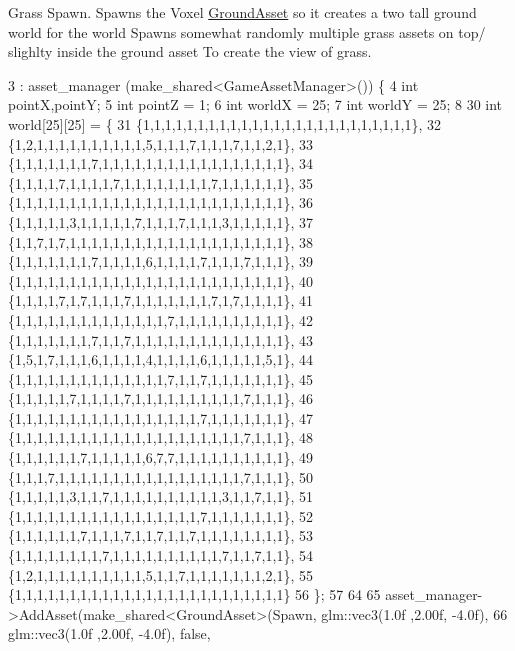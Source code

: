 Grass Spawn. Spawns the Voxel \hyperlink{class_ground_asset}{Ground\+Asset} so it creates a two tall ground world for the world Spawns somewhat randomly multiple grass assets on top/ slighlty inside the ground asset To create the view of grass.
\begin{DoxyCode}
3                      : asset\_manager (make\_shared<GameAssetManager>())  \{ 
4         \textcolor{keywordtype}{int} pointX,pointY;
5         \textcolor{keywordtype}{int} pointZ = 1;
6         \textcolor{keywordtype}{int} worldX = 25;
7         \textcolor{keywordtype}{int} worldY = 25;
8 
30           \textcolor{keywordtype}{int} world[25][25] = \{
31           \{1,1,1,1,1,1,1,1,1,1,1,1,1,1,1,1,1,1,1,1,1,1,1,1,1\},
32           \{1,2,1,1,1,1,1,1,1,1,1,1,5,1,1,1,7,1,1,1,7,1,1,2,1\},
33           \{1,1,1,1,1,1,1,7,1,1,1,1,1,1,1,1,1,1,1,1,1,1,1,1,1\},
34           \{1,1,1,1,7,1,1,1,1,7,1,1,1,1,1,1,1,1,7,1,1,1,1,1,1\},
35           \{1,1,1,1,1,1,1,1,1,1,1,1,1,1,1,1,1,1,1,1,1,1,1,1,1\},
36           \{1,1,1,1,1,3,1,1,1,1,1,7,1,1,1,7,1,1,1,3,1,1,1,1,1\},
37           \{1,1,7,1,7,1,1,1,1,1,1,1,1,1,1,1,1,1,1,1,1,1,1,1,1\},
38           \{1,1,1,1,1,1,1,7,1,1,1,1,6,1,1,1,1,7,1,1,1,7,1,1,1\},
39           \{1,1,1,1,1,1,1,1,1,1,1,1,1,1,1,1,1,1,1,1,1,1,1,1,1\},
40           \{1,1,1,1,7,1,7,1,1,1,7,1,1,1,1,1,1,1,7,1,7,1,1,1,1\},
41           \{1,1,1,1,1,1,1,1,1,1,1,1,1,1,7,1,1,1,1,1,1,1,1,1,1\},
42           \{1,1,1,1,1,1,1,7,1,1,7,1,1,1,1,1,1,1,1,1,1,1,1,1,1\},
43           \{1,5,1,7,1,1,1,6,1,1,1,1,4,1,1,1,1,6,1,1,1,1,1,5,1\},
44           \{1,1,1,1,1,1,1,1,1,1,1,1,1,1,7,1,1,7,1,1,1,1,1,1,1\},
45           \{1,1,1,1,1,7,1,1,1,1,7,1,1,1,1,1,1,1,1,1,1,7,1,1,1\},
46           \{1,1,1,1,1,1,1,1,1,1,1,1,1,1,1,1,1,7,1,1,1,1,1,1,1\},
47           \{1,1,1,1,1,1,1,1,1,1,1,1,1,1,1,1,1,1,1,1,1,7,1,1,1\},
48           \{1,1,1,1,1,1,7,1,1,1,1,1,6,7,7,1,1,1,1,1,1,1,1,1,1\},
49           \{1,1,1,7,1,1,1,1,1,1,1,1,1,1,1,1,1,1,1,1,1,7,1,1,1\},
50           \{1,1,1,1,1,3,1,1,7,1,1,1,1,1,1,1,1,1,1,3,1,1,7,1,1\},
51           \{1,1,1,1,1,1,1,1,1,1,1,1,1,1,1,1,1,7,1,1,1,1,1,1,1\},
52           \{1,1,1,1,1,1,7,1,1,1,7,1,1,7,1,1,7,1,1,1,1,1,1,1,1\},
53           \{1,1,1,1,1,1,1,1,7,1,1,1,1,1,1,1,1,1,1,7,1,1,7,1,1\},
54           \{1,2,1,1,1,1,1,1,1,1,1,1,5,1,1,7,1,1,1,1,1,1,1,2,1\},
55           \{1,1,1,1,1,1,1,1,1,1,1,1,1,1,1,1,1,1,1,1,1,1,1,1,1\}        
56           \};
57         
64 
65         asset\_manager->AddAsset(make\_shared<GroundAsset>(Spawn, glm::vec3(1.0f ,2.00f, -4.0f),
66                                                          glm::vec3(1.0f ,2.00f, -4.0f), \textcolor{keyword}{false},

\end{DoxyCode}
